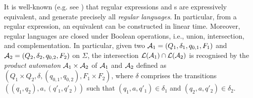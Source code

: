 {It is well-known (e.g. see \cite{HU79}) that regular expressions and \FA{}s are
expressively equivalent, and generate precisely all \emph{regular languages}.
In particular, from a regular expression, an equivalent \FA{} can be constructed
in linear time. Moreover, regular languages are closed under Boolean
operations, i.e., union, intersection, and complementation.
In particular, given two \FA{} $\mathcal{A}_1=(Q_1, \delta_1, q_{0,1}, F_1)$ and
$\mathcal{A}_2=(Q_2, \delta_2, q_{0,2}, F_2)$ on $\Sigma$, the intersection $\mathcal{L}(\mathcal{A}_1)
\cap \mathcal{L}(\mathcal{A}_2)$ is recognised by the \emph{product automaton} $\mathcal{A}_1 \times
\mathcal{A}_2$ of $\mathcal{A}_1$ and $\mathcal{A}_2$ defined as $(Q_1 \times Q_2, \delta, (q_{0,1}, q_{0,2}), F_1 \times F_2)$, where $\delta$ comprises the transitions $((q_1, q_2), a, (q'_1, q'_2))$ such that $(q_1, a, q'_1) \in \delta_1$ and $(q_2, a, q'_2) \in \delta_2$.
}
